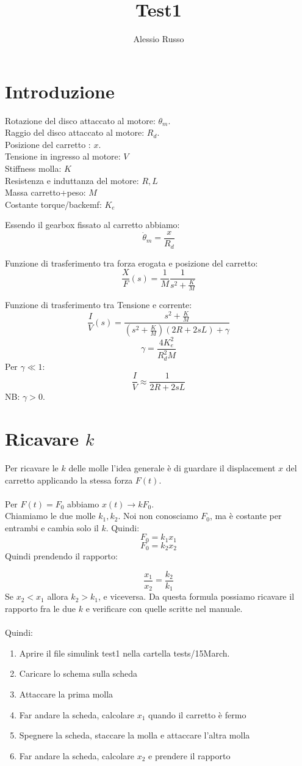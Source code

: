 \documentclass[10pt,a4paper]{article}
\author{Alessio Russo}
\title{Test1}
\begin{document}
\tableofcontents

\section{Introduzione}
Rotazione del disco attaccato al motore: $\theta_m$. \\
Raggio del disco attaccato al motore: $R_d$. \\
Posizione del carretto : $x$. \\
Tensione in ingresso al motore: $V$ \\
Stiffness molla: $K$ \\
Resistenza e induttanza del motore: $R,L$ \\
Massa carretto+peso: $M$ \\
Costante torque/backemf: $K_e$

Essendo il gearbox fissato al carretto abbiamo:
$$\dot{\theta}_m = \frac{x}{R_d} $$

Funzione di trasferimento tra forza erogata e posizione del carretto:
$$\frac{X}{F}(s) = \frac{1}{M} \frac{1}{s^2+\frac{K}{M}}$$

Funzione di trasferimento tra Tensione e corrente:
$$\frac{I}{V}(s) = \frac{s^2+\frac{K}{M}}{(s^2+\frac{K}{M})(2R+2sL)+\gamma }$$
$$\gamma = \frac{4K_e^2}{R_d^2M}$$
Per $\gamma \ll 1$:
$$\frac{I}{V} \approx \frac{1}{2R+2sL}$$
NB: $\gamma > 0$.
\newpage
\section{Ricavare $k$}
Per ricavare le $k$ delle molle l'idea generale è di guardare il displacement $x$ del carretto applicando la stessa forza $F(t)$. \\ \\
Per $F(t)=F_0$ abbiamo $x(t) \to kF_0$. \\
Chiamiamo le due molle $k_1,k_2$. Noi non conosciamo $F_0$, ma è costante per entrambi e cambia solo il $k$. Quindi:
$$F_0 = k_1 x_1$$
$$F_0 = k_2 x_2$$
Quindi prendendo il rapporto:

$$\frac{x_1}{x_2} = \frac{k_2}{k_1}$$
Se $x_2 < x_1$ allora $k_2 > k_1$, e viceversa.  Da questa formula possiamo ricavare il rapporto fra le due $k$ e verificare con quelle scritte nel manuale. \\ \\
Quindi:
\begin{enumerate}
\item Aprire il file simulink test1 nella cartella tests/15March.
\item Caricare lo schema sulla scheda
\item Attaccare la prima molla
\item Far andare la scheda, calcolare $x_1$ quando il carretto è fermo
\item Spegnere la scheda, staccare la molla e attaccare l'altra molla
\item Far andare la scheda, calcolare $x_2$ e prendere il rapporto
\end{enumerate}
\newpage
\end{document}
